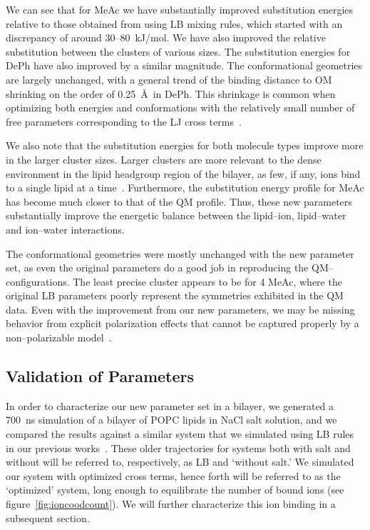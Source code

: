 \documentclass[12pt,openany,final]{book}
\begin{document}
We can see that for MeAc we have substantially improved substitution
energies relative to those obtained from using LB mixing rules, 
which started with an discrepancy of around 30--80~kJ/mol. We have also
improved the relative substitution between the clusters of various sizes. 
The substitution energies for DePh have also improved by a similar magnitude. 
The conformational geometries are largely unchanged, 
with a general trend of the binding distance to OM\* shrinking on the order of 0.25~\AA~in DePh. 
This shrinkage is common when optimizing both energies and conformations
with the relatively small number of free parameters corresponding to
the LJ cross terms~\cite{wineman:2019}.

We also note that the substitution energies for both molecule types improve more in the
larger cluster sizes. Larger clusters are more relevant to the dense
environment in the lipid headgroup region of the bilayer, 
as few, if any, ions bind to a single lipid at a time~\cite{kruczek:2017}. 
Furthermore, the substitution energy profile for MeAc has become much closer to that of the QM profile. 
Thus, these new parameters substantially improve the energetic balance
between the lipid--ion, lipid--water and ion--water interactions.

The conformational geometries were mostly unchanged with the new
parameter set, as even the original parameters do a good job in reproducing the QM--configurations. 
The least precise cluster appears to be for 4 MeAc, 
where the original LB parameters poorly represent the symmetries exhibited in the QM data. 
Even with the improvement from our new parameters, 
we may be missing behavior from explicit polarization effects that
cannot be captured properly by a non--polarizable model~\cite{varma:2010}.

\subsection{Validation of Parameters}

In order to characterize our new parameter set in a bilayer, 
we generated a 700~ns simulation of a bilayer of POPC lipids in NaCl salt solution, 
and we compared the results against a similar system that we simulated using
LB rules in our previous works~\cite{kruczek:2017,kruczek:2019}. 
These older trajectories for systems both with salt and without will be referred to, 
respectively, as  LB and `without salt.'  
We simulated our system with optimized cross terms, 
hence forth will be referred to as the `optimized' system, 
long enough to equilibrate the number of bound ions (see figure~\ref{fig:ioncoodcount}). 
We will further characterize this ion binding in a subsequent section.
\end{document}
